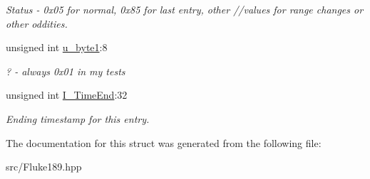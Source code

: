 \begin{DoxyCompactItemize}
\begin{DoxyCompactList}\small\item\em Status -\/ 0x05 for normal, 0x85 for last entry, other //values for range changes or other oddities. \item\end{DoxyCompactList}\item 
\hypertarget{structFluke_1_1Fluke189_1_1qd2__set__t_aec78e59ad38fbd0916f0632ed1c1bf4b}{
unsigned int \hyperlink{structFluke_1_1Fluke189_1_1qd2__set__t_aec78e59ad38fbd0916f0632ed1c1bf4b}{u\_\-byte1}:8}
\label{structFluke_1_1Fluke189_1_1qd2__set__t_aec78e59ad38fbd0916f0632ed1c1bf4b}

\begin{DoxyCompactList}\small\item\em ? -\/ always 0x01 in my tests \item\end{DoxyCompactList}\item 
\hypertarget{structFluke_1_1Fluke189_1_1qd2__set__t_a57828e561ec4f5c8690868f9e74cab8c}{
unsigned int \hyperlink{structFluke_1_1Fluke189_1_1qd2__set__t_a57828e561ec4f5c8690868f9e74cab8c}{I\_\-TimeEnd}:32}
\label{structFluke_1_1Fluke189_1_1qd2__set__t_a57828e561ec4f5c8690868f9e74cab8c}

\begin{DoxyCompactList}\small\item\em Ending timestamp for this entry. \item\end{DoxyCompactList}\end{DoxyCompactItemize}


The documentation for this struct was generated from the following file:\begin{DoxyCompactItemize}
\item 
src/Fluke189.hpp\end{DoxyCompactItemize}
